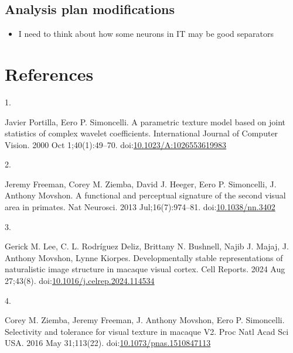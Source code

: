 \documentclass[
  11pt,
  letterpaper,
  DIV=11,
  numbers=noendperiod]{scrartcl}
\newlength{\cslhangindent}
\newlength{\csllabelwidth}
\newenvironment{CSLReferences}[2] %
 {\begin{list}{}{%
  \setlength{\itemindent}{0pt}
  \setlength{\leftmargin}{0pt}
  \setlength{\parsep}{0pt}
  \ifodd #1
   \setlength{\leftmargin}{\cslhangindent}
   \setlength{\itemindent}{-1\cslhangindent}
  \fi
  \setlength{\itemsep}{#2\baselineskip}}}
 {\end{list}}
\newcommand{\CSLLeftMargin}[1]{\parbox[t]{\csllabelwidth}{\strut#1\strut}}
\newcommand{\CSLRightInline}[1]{\parbox[t]{\linewidth - \csllabelwidth}{\strut#1\strut}}
\providecommand{\tightlist}{%
  \setlength{\itemsep}{0pt}\setlength{\parskip}{0pt}}
\begin{document}
\subsection{Analysis plan
modifications}\label{analysis-plan-modifications}

\begin{itemize}
\tightlist
\item
  I need to think about how some neurons in IT may be good separators
\end{itemize}

\section{References}\label{references}

\label{refs}
\begin{CSLReferences}{0}{1}
\CSLLeftMargin{1. }%
\CSLRightInline{Javier Portilla, Eero P. Simoncelli. A parametric
texture model based on joint statistics of complex wavelet coefficients.
International Journal of Computer Vision. 2000 Oct 1;40(1):49--70.
doi:\href{https://doi.org/10.1023/A:1026553619983}{10.1023/A:1026553619983}}

\CSLLeftMargin{2. }%
\CSLRightInline{Jeremy Freeman, Corey M. Ziemba, David J. Heeger, Eero
P. Simoncelli, J. Anthony Movshon. A functional and perceptual signature
of the second visual area in primates. Nat Neurosci. 2013
Jul;16(7):974--81.
doi:\href{https://doi.org/10.1038/nn.3402}{10.1038/nn.3402}}

\CSLLeftMargin{3. }%
\CSLRightInline{Gerick M. Lee, C. L. Rodríguez Deliz, Brittany N.
Bushnell, Najib J. Majaj, J. Anthony Movshon, Lynne Kiorpes.
Developmentally stable representations of naturalistic image structure
in macaque visual cortex. Cell Reports. 2024 Aug 27;43(8).
doi:\href{https://doi.org/10.1016/j.celrep.2024.114534}{10.1016/j.celrep.2024.114534}}

\CSLLeftMargin{4. }%
\CSLRightInline{Corey M. Ziemba, Jeremy Freeman, J. Anthony Movshon,
Eero P. Simoncelli. Selectivity and tolerance for visual texture in
macaque V2. Proc Natl Acad Sci USA. 2016 May 31;113(22).
doi:\href{https://doi.org/10.1073/pnas.1510847113}{10.1073/pnas.1510847113}}

\end{CSLReferences}
\end{document}

